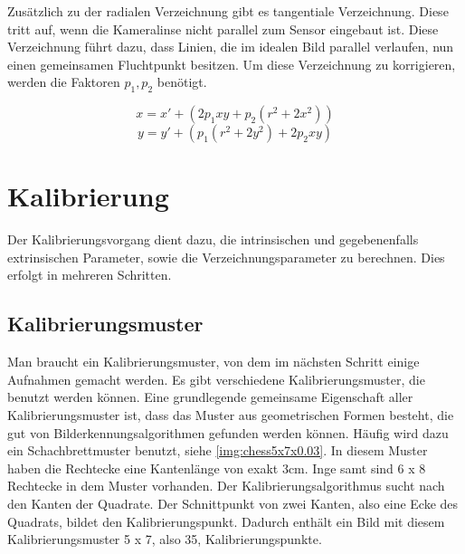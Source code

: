 Zusätzlich zu der radialen Verzeichnung gibt es tangentiale Verzeichnung. Diese tritt auf, wenn die Kameralinse nicht parallel zum Sensor eingebaut ist. Diese Verzeichnung führt dazu, dass Linien, die im idealen Bild parallel verlaufen, nun einen gemeinsamen Fluchtpunkt besitzen. Um diese Verzeichnung zu korrigieren, werden die Faktoren $p_1, p_2$ benötigt.

\begin{equation}
	x = x' + (2 p_1 xy + p_2 (r^2 + 2 x^2))
\end{equation}
\begin{equation}
	y = y' + (p_1(r^2 + 2 y^2) + 2p_2 xy)
\end{equation}

\section{Kalibrierung} %
\label{sec:kalibrierung}
Der Kalibrierungsvorgang dient dazu, die intrinsischen und gegebenenfalls extrinsischen Parameter, sowie die Verzeichnungsparameter zu berechnen. Dies erfolgt in mehreren Schritten.

\subsection{Kalibrierungsmuster} %
\label{sub:kalibrierungsmuster}
Man braucht ein Kalibrierungsmuster, von dem im nächsten Schritt einige Aufnahmen gemacht werden. Es gibt verschiedene Kalibrierungsmuster, die benutzt werden können. Eine grundlegende gemeinsame Eigenschaft aller Kalibrierungsmuster ist, dass das Muster aus geometrischen Formen besteht, die gut von Bilderkennungsalgorithmen gefunden werden können. Häufig wird dazu ein Schachbrettmuster benutzt, siehe \autoref{img:chess5x7x0.03}. In diesem Muster haben die Rechtecke eine Kantenlänge von exakt 3cm. Inge samt sind 6 x 8 Rechtecke in dem Muster vorhanden. Der Kalibrierungsalgorithmus sucht nach den Kanten der Quadrate. Der Schnittpunkt von zwei Kanten, also eine Ecke des Quadrats, bildet den Kalibrierungspunkt. Dadurch enthält ein Bild mit diesem Kalibrierungsmuster 5 x 7, also 35, Kalibrierungspunkte.

